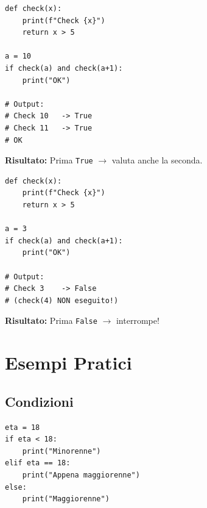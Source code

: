 \begin{tcolorbox}[
    title=Confronto: Short-circuit in azione,
    colback=gray!5,
    colframe=gray!60,
    fonttitle=\bfseries,
    boxrule=0.8pt,
    arc=2pt,
    breakable=false
]

\begin{minipage}[t]{0.48\textwidth}
\begin{tcolorbox}[
    title=\textbf{Caso 1: Valuta entrambe},
    colback=orange!10,
    colframe=orange!80!black,
    fonttitle=\bfseries,
    boxrule=1.5pt,
    arc=2mm
]
\begin{lstlisting}
def check(x):
    print(f"Check {x}")
    return x > 5

a = 10
if check(a) and check(a+1):
    print("OK")

# Output:
# Check 10   -> True
# Check 11   -> True
# OK
\end{lstlisting}
\vspace{1mm}
\scriptsize\textbf{Risultato:} Prima \texttt{True} $\rightarrow$ valuta anche la seconda.
\end{tcolorbox}
\end{minipage}
\hfill
\begin{minipage}[t]{0.48\textwidth}
\begin{tcolorbox}[
    title=\textbf{Caso 2: Short-circuit!},
    colback=green!10,
    colframe=green!70!black,
    fonttitle=\bfseries,
    boxrule=1.5pt,
    arc=2mm
]
\begin{lstlisting}
def check(x):
    print(f"Check {x}")
    return x > 5

a = 3
if check(a) and check(a+1):
    print("OK")

# Output:
# Check 3    -> False
# (check(4) NON eseguito!)
\end{lstlisting}
\vspace{1mm}
\scriptsize\textbf{Risultato:} Prima \texttt{False} $\rightarrow$ interrompe!
\end{tcolorbox}
\end{minipage}

\end{tcolorbox}

\vspace{0.3cm}

\section{Esempi Pratici}
\label{sec:cf-esempi}
\subsection{Condizioni}
\label{subsec:cf-condizioni}
\begin{lstlisting}
eta = 18
if eta < 18:
    print("Minorenne")
elif eta == 18:
    print("Appena maggiorenne")
else:
    print("Maggiorenne")
\end{lstlisting}

